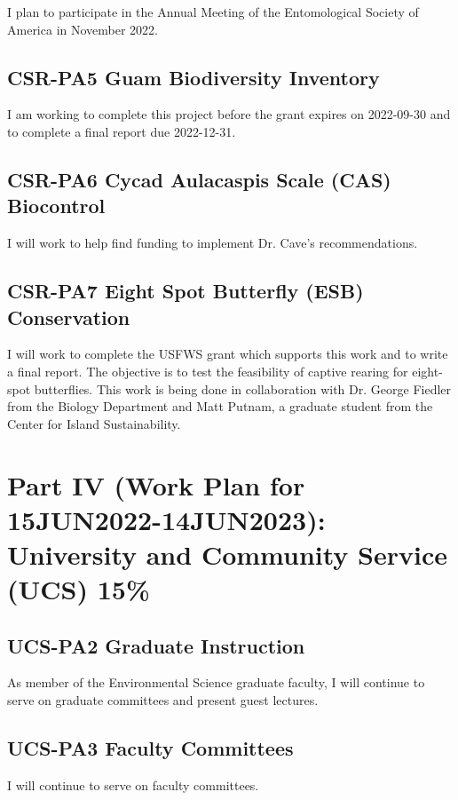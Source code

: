 I plan to participate in the Annual Meeting of the Entomological Society of America in November 2022.

\subsection{CSR-PA5 Guam Biodiversity Inventory} I am working to complete this project before the grant expires on 2022-09-30 and to complete a final report due 2022-12-31.

\subsection{CSR-PA6 Cycad Aulacaspis Scale (CAS) Biocontrol}

I will work to help find funding to implement Dr. Cave's recommendations. 

\subsection{CSR-PA7 Eight Spot Butterfly (ESB) Conservation}

I will work to complete the USFWS grant which supports this work and to write a final report. The objective is to test the feasibility of captive rearing for eight-spot butterflies. This work is being done in collaboration with Dr. George Fiedler from the Biology Department and Matt Putnam, a graduate student from the Center for Island Sustainability. 

\newpage
\section{Part IV (Work Plan for 15JUN2022-14JUN2023): University and Community Service (UCS) 15\%}

\subsection{UCS-PA2 Graduate Instruction}As member of the Environmental Science graduate faculty, I will continue to serve on graduate committees and present guest lectures.

\subsection{UCS-PA3 Faculty Committees}
I will continue to serve on faculty committees. 


